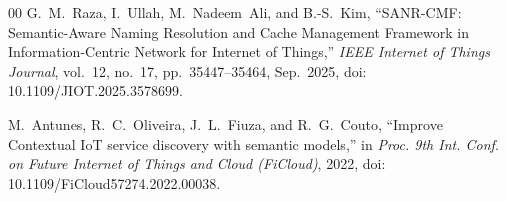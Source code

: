 \documentclass[journal]{IEEEtran}
\begin{document}
\begin{thebibliography}{00}
G.~M.~Raza, I.~Ullah, M.~Nadeem~Ali, and B.-S.~Kim,
``SANR-CMF: Semantic-Aware Naming Resolution and Cache Management Framework in Information-Centric Network for Internet of Things,''
\emph{IEEE Internet of Things Journal}, vol.~12, no.~17, pp.~35447--35464, Sep.~2025, doi: 10.1109/JIOT.2025.3578699.

M.~Antunes, R.~C.~Oliveira, J.~L.~Fiuza, and R.~G.~Couto,
``Improve Contextual IoT service discovery with semantic models,''
in \emph{Proc. 9th Int. Conf. on Future Internet of Things and Cloud (FiCloud)}, 2022, doi: 10.1109/FiCloud57274.2022.00038.


\end{thebibliography}
\end{document}
